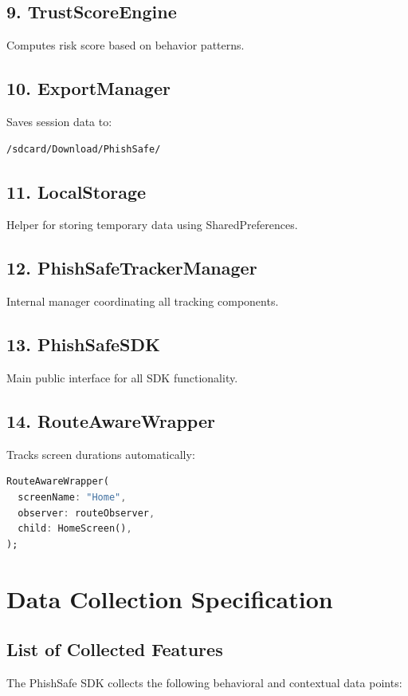 \documentclass[11pt]{article}
\begin{document}
\subsection{9. TrustScoreEngine}
Computes risk score based on behavior patterns.

\subsection{10. ExportManager}
Saves session data to:

\begin{lstlisting}
/sdcard/Download/PhishSafe/
\end{lstlisting}

\subsection{11. LocalStorage}
Helper for storing temporary data using SharedPreferences.

\subsection{12. PhishSafeTrackerManager}
Internal manager coordinating all tracking components.

\subsection{13. PhishSafeSDK}
Main public interface for all SDK functionality.

\subsection{14. RouteAwareWrapper}
Tracks screen durations automatically:

\begin{lstlisting}[language=Dart]
RouteAwareWrapper(
  screenName: "Home",
  observer: routeObserver,
  child: HomeScreen(),
);
\end{lstlisting}

\clearpage
\section{Data Collection Specification}

\subsection{List of Collected Features}
The PhishSafe SDK collects the following behavioral and contextual data points:
\end{document}
